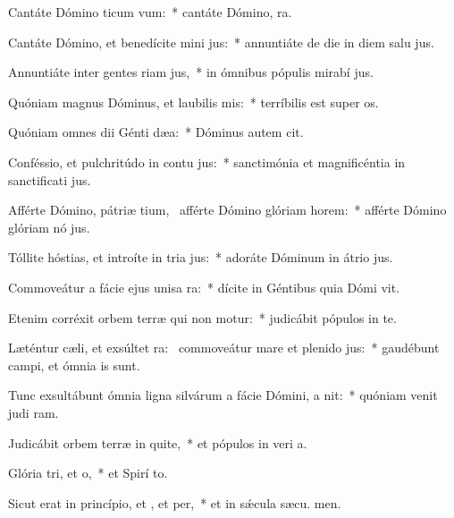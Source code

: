 \item Cantáte Dómino ticum vum:~* cantáte Dómino,  ra.
\item Cantáte Dómino, et benedícite mini jus:~* annuntiáte de die in diem salu jus.
\item Annuntiáte inter gentes riam jus,~* in ómnibus pópulis mirabí jus.
\item Quóniam magnus Dóminus, et laubilis mis:~* terríbilis est super  os.
\item Quóniam omnes dii Génti dæa:~* Dóminus autem  cit.
\item Conféssio, et pulchritúdo in contu jus:~* sanctimónia et magnificéntia in sanctificati jus.
\item Afférte Dómino, pátriæ tium,~\pscross{} afférte Dómino glóriam  horem:~* afférte Dómino glóriam nó jus.
\item Tóllite hóstias, et introíte in tria jus:~* adoráte Dóminum in átrio  jus.
\item Commoveátur a fácie ejus unisa ra:~* dícite in Géntibus quia Dómi vit.
\item Etenim corréxit orbem terræ qui non motur:~* judicábit pópulos in te.
\item Læténtur cæli, et exsúltet ra:~\pscross{} commoveátur mare et plenido jus:~* gaudébunt campi, et ómnia   is sunt.
\item Tunc exsultábunt ómnia ligna silvárum a fácie Dómini, a nit:~* quóniam venit judi ram.
\item Judicábit orbem terræ in quite,~* et pópulos in veri a.
\item Glória tri, et o,~* et Spirí to.
\item Sicut erat in princípio, et , et per,~* et in sǽcula sæcu. men.
